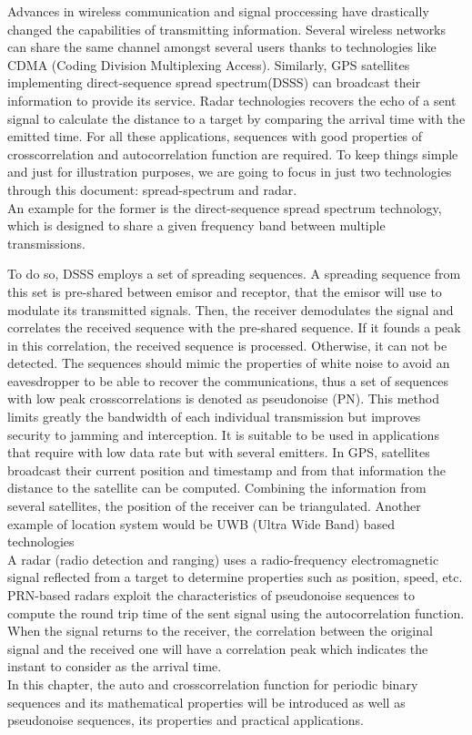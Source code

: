 Advances in wireless communication and signal proccessing have drastically
changed the capabilities of transmitting information. Several wireless
networks can share the same channel amongst several users thanks to technologies like
CDMA (Coding Division Multiplexing Access). Similarly, GPS \cite{GPS} satellites implementing direct-sequence spread
spectrum(DSSS) can broadcast their information to provide its service.  Radar technologies recovers the echo of a sent signal to calculate 
the distance to a target by comparing the arrival time with the emitted time. For all these applications, sequences with good properties
of crosscorrelation and autocorrelation function are required. To keep things simple and just for illustration purposes, we are going to focus in just
two technologies through this document: spread-spectrum and radar. \\

An example for the former is the direct-sequence spread spectrum technology\cite{DSSS_1}\cite{DSSS}, which is
designed to share a given frequency band between multiple transmissions. 

To do so, DSSS employs a set of spreading sequences. A spreading sequence from this set is pre-shared
between emisor and receptor, that the emisor will use to modulate its transmitted signals. Then, the receiver demodulates the signal and correlates the received
sequence with the pre-shared sequence. If it founds a peak in this correlation, the received sequence is processed. Otherwise, it can not be detected.
The sequences should mimic the properties of white noise to avoid an eavesdropper to be able to recover the communications, thus  a set of  sequences with low peak
crosscorrelations is denoted as pseudonoise (PN). This method limits greatly the bandwidth of each individual transmission but improves security to
jamming and interception.  It is  suitable to be used in applications that require with low data rate but with several emitters.  In GPS, satellites broadcast their current position and timestamp and from that information the distance to the satellite can be computed. Combining the information from several satellites, the position of the receiver can be triangulated. Another example of location system would be UWB (Ultra Wide Band) based technologies\\

A radar (radio detection and ranging) uses a radio-frequency electromagnetic
signal reflected from a target to determine properties such as position, speed,
etc.  PRN-based radars\cite{prn_radar_example1}\cite{prn_radar_example2}  exploit the characteristics of pseudonoise sequences to compute the
round trip time of the sent signal using the autocorrelation function. When
the signal returns to the receiver, the correlation between the original
signal and the received one will have a correlation peak which indicates
the instant to consider as the arrival time.\\

In this chapter, the auto and crosscorrelation function for
periodic binary sequences and its mathematical properties will be introduced
as well as pseudonoise sequences, its properties and practical applications.

 
